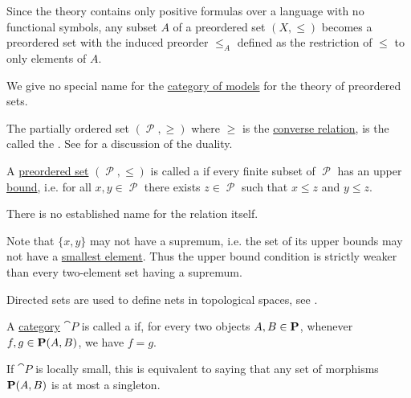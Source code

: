 \begin{definition}
\begin{thmenum}[series=def:preordered_set]
     Since the theory contains only positive formulas over a language with no functional symbols, any subset \( A \) of a preordered set \( (X, \leq) \) becomes a preordered set with the induced preorder \( \leq_A \) defined as the restriction of \( \leq \) to only elements of \( A \).

     We give no special name for the \hyperref[def:category_of_first_order_models]{category of models} for the theory of preordered sets.

     The partially ordered set \( (\mscrP, \geq) \) where \( \geq \) is the \hyperref[def:binary_relation/converse]{converse relation}, is the called the . See  for a discussion of the duality.
  \end{thmenum}
\end{definition}

\begin{definition}\label{def:directed_set}
  A \hyperref[def:preordered_set]{preordered set} \( (\mscrP, \leq) \) is called a  if every finite subset of \( \mscrP \) has an upper \hyperref[def:preordered_set/upper_and_lower_bounds]{bound}, i.e. for all \( x, y \in \mscrP \) there exists \( z \in \mscrP \) such that \( x \leq z \) and \( y \leq z \).

  There is no established name for the relation itself.

  Note that \( \{ x, y \} \) may not have a supremum, i.e. the set of its upper bounds may not have a \hyperref[def:preordered_set/maximum_and_minimum]{smallest element}. Thus the upper bound condition is strictly weaker than every two-element set having a supremum.

  Directed sets are used to define nets in topological spaces, see .
\end{definition}

\begin{definition}\label{def:thin_category}
  A \hyperref[def:category]{category} \( \cat{P} \) is called a  if, for every two objects \( A, B \in \operatorname{\mathbf{P}} \), whenever \( f, g \in \operatorname{\mathbf{P}}(A, B) \), we have \( f = g \).

  If \( \cat{P} \) is locally small, this is equivalent to saying that any set of morphisms \( \operatorname{\mathbf{P}}(A, B) \) is at most a singleton.
\end{definition}

